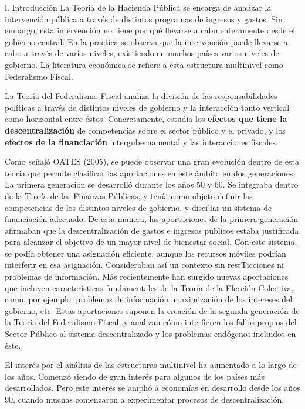 \documentclass[10pt,a4paper]{article}
\begin{document}
 l. Introducción
La Teoría de la Hacienda Pública se encarga de analizar la intervención pública a través de distintos programas de ingresos y gastos. Sin embargo, esta intervención no tiene por qué llevarse a cabo enteramente desde el gobierno central. En la práctica se observa que la intervención puede llevarse a cabo a través de varios niveles, existiendo en muchos países varios niveles de gobierno. La literatura económica se refiere a esta estructura multinivel como Federalismo Fiscal. 

La Teoría del Federalismo Fiscal analiza la división de las responsabilidades políticas a través de distintos niveles de gobierno y la interacción tanto vertical como horizontal entre éstos. Concretamente, estudia los \textbf{efectos que tiene la descentralización} de competencias sobre el sector público y el privado, y los \textbf{efectos de la financiación} intergubernamental y las interacciones fiscales.

Como señaló OATES (2005), se puede observar una gran evolución dentro de esta teoría que permite clasificar las aportaciones en este ámbito en dos generaciones. La primera generación se desarrolló durante los años 50 y 60. Se integraba dentro de la Teoría de las Finanzas Públicas, y tenía como objeto definir las competencias de los distintos niveles de gobierno. y disei'iar un sistema de financiación adecuado. De esta manera, las aportaciones de la primera generación afirmaban que la descentralización de gastos e ingresos públicos estaba justificada para alcanzar el objetivo de un mayor nivel de bienestar social. Con este sistema. se podía obtener una asignación eficiente, aunque los recursos móviles podrían interferir en esa asignación. Consideraban así un contexto sin restTicciones ni problemas de información. Más recientemente han surgido nuevas aportaciones que incluyen características fundamentales de la Teoría de la Elección Colectiva, como, por ejemplo: problemas de información, maximización de los intereses del gobierno, etc. Estas aportaciones suponen la creación de la segunda generación de la Teoría del Federalismo Fiscal, y analizan cómo interfieren los fallos propios del Sector Público al sistema descentralizado y los problemas endógenos incluidos en éste.

El interés por el análisis de las estructuras multinivel ha aumentado a lo largo de los años. Comenzó siendo de gran interés para algunos de los países más desarrollados. Pero este interés se amplió a economías en desarrollo desde los años 90, cuando muchas comenzaron a experimentar procesos de descentralización.
\end{document}
